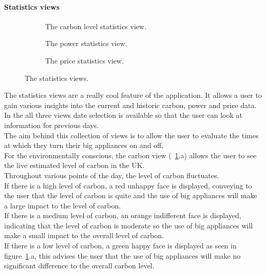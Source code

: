 \documentclass[draft,preprint,12pt,3p]{elsarticle}
\begin{document}
\paragraph{Statistics views}
\begin{figure}[H]
    \centering
    \begin{subfigure}[t]{0.32\columnwidth}
        \centering
        \caption{The carbon level statistics view.}
    \end{subfigure}
    \begin{subfigure}[t]{0.32\columnwidth}
        \centering
        \caption{The power statistics view.}
    \end{subfigure}
    \begin{subfigure}[t]{0.32\columnwidth}
        \centering
        \caption{The price statistics view.}
    \end{subfigure}
    \caption {The statistics views.}
    \label{fig:statisticsviews}
\end{figure}
The statistics views are a really cool feature of the application. It allows a user to gain various insights into the current and historic carbon, power and price data. In the all three views date selection is available so that the user can look at information for previous days.\\
The aim behind this collection of views is to allow the user to evaluate the times at which they turn their big appliances on and off.\\
For the environmentally conscious, the carbon view (~\ref{fig:statisticsviews}.a) allows the user to see the live estimated level of carbon in the UK.\\ 
Throughout various points of the day, the level of carbon fluctuates.\\ 
If there is a high level of carbon, a red unhappy face is displayed, conveying to the user that the level of carbon is quite and the use of big appliances will make a large impact to the level of carbon. \\
If there is a medium level of carbon, an orange indifferent face is displayed, indicating that the level of carbon is moderate so the use of big appliances will make a small impact to the overall level of carbon.\\
If there is a low level of carbon, a green happy face is displayed as seen in figure~\ref{fig:statisticsviews}.a, this advises the user that the use of big appliances will make no significant difference to the overall carbon level.\\
\end{document}
